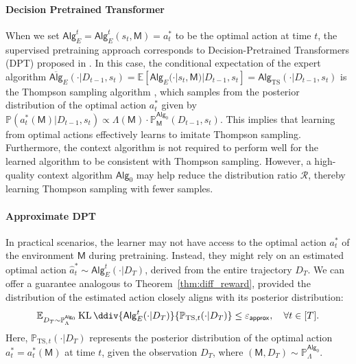 \documentclass[10pt]{article}
\newcommand{\eps}{\varepsilon}
\newcommand{\KL}{\operatorname{KL}\ddiv}
\newcommand{\<}{\left\langle}
\renewcommand{\>}{\right\rangle}
\newcommand{\E}{\mathbb{E}}
\renewcommand{\P}{\mathbb{P}}
\newcommand{\inst}{{\mathsf{M}}}
\newcommand{\TS}{{\mathrm{TS}}}
\newcommand{\state}{{s}}
\newcommand{\action}{{a}}
\newcommand{\totlen}{{T}}
\newcommand{\sAlg}{{\mathsf{Alg}}}
\newcommand{\osAlg}{\overline{\mathsf{Alg}}}
\newcommand{\dset}{{D}}
\newcommand{\appeps}{\eps_{{\mathsf{approx}}}}
\newcommand{\prior}{{\Lambda}}
\newcommand{\shortexp}{{E}}
\newcommand{\distratio}{{\mathcal{R}}}
\begin{document}
\paragraph{Decision Pretrained Transformer} When we set $\sAlg_\shortexp^t = \sAlg_\shortexp^t(\state_t,\inst)=\action^*_t$ to be the optimal action at time $t$, the supervised pretraining approach corresponds to Decision-Pretrained Transformers (DPT) proposed in \cite{lee2023supervised}. In this case, the conditional expectation of the expert algorithm $\osAlg_\shortexp(\cdot|\dset_{t-1},\state_t)=\E[\sAlg_{\shortexp}(\cdot|\state_t,\inst)|\dset_{t-1},\state_t]=\sAlg_{\TS}(\cdot|\dset_{t-1},\state_t)$ is the Thompson sampling algorithm \citep[Theorem 1]{lee2023supervised}, which samples from the posterior distribution of the optimal action $\action^*_t$ given by $\P(a^*_t(\inst) |\dset_{t-1},\state_t)\propto \prior(\inst)\cdot\P_\inst^{\sAlg_0}(\dset_{t-1},\state_t)$. This implies that learning from optimal actions effectively learns to imitate Thompson sampling. Furthermore, the context algorithm is not required to perform well for the learned algorithm to be consistent with Thompson sampling. However, a high-quality context algorithm $\sAlg_0$ may help reduce the distribution ratio $\distratio$, thereby learning Thompson sampling with fewer samples. 






\paragraph{Approximate DPT} In practical scenarios, the learner may not have access to the optimal action $\action^*_t$ of the environment $\inst$ during pretraining. Instead, they might rely on an estimated optimal action $\widehat\action_t^* \sim \sAlg_{\shortexp}^t(\cdot | \dset_\totlen)$, derived from the entire trajectory $\dset_\totlen$. We can offer a guarantee analogous to Theorem~\ref{thm:diff_reward}, provided the distribution of the estimated action closely aligns with its posterior distribution: 
\begin{align}\E_{\dset_\totlen\sim\P_{\prior}^{\sAlg_0}}\KL{\sAlg_{\shortexp}^t(\cdot | \dset_\totlen)}{\P_{\TS,t}(\cdot|\dset_\totlen)}\leq\appeps,~~~ \forall t \in [\totlen]. 
\label{eq:app_opt_cond}
\end{align}
Here, $\P_{\TS,t}(\cdot|\dset_\totlen)$ represents the posterior distribution of the optimal action $\action^*_t=\action^*_t(\inst)$ at time $t$, given the observation $\dset_\totlen$, where $(\inst, \dset_\totlen) \sim \P_\prior^{\sAlg_0}$. 
\end{document}
